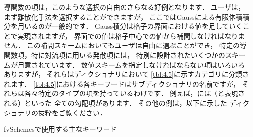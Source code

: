 導関数の項は，このような選択の自由のさらなる好例となります．
ユーザは，まず離散化手法を選択することができますが，
ここではGaussによる有限体積積分を用いるのが一般的です．
Gauss積分は格子の界面における値を足していくことで実現されますが，
界面での値は格子中心での値から補間しなければなりません．
この補間スキームにおいてもユーザは自由に選ぶことができ，
特定の導関数項，特に対流項に用いる発散項には，
特別に設計されたいくつかのスキームが用意されています．
数値スキームを指定しなければならない項はいろいろありますが，
それらはディクショナリにおいて
\autoref{tbl:4.5}に示すカテゴリに分類されます．
\autoref{tbl:4.5}における各キーワードはサブディクショナリの名前ですが，
それらは各々特定のタイプの項を持っているわけです．
例えば，には（と表現される）といった
全ての勾配項があります．
その他の例は，以下に示した
%
%
ディクショナリの抜粋をご覧ください．


\begin{table}[ht]
 
 \caption{fvSchemesで使用する主なキーワード}
 \label{tbl:4.5}
\end{table}


